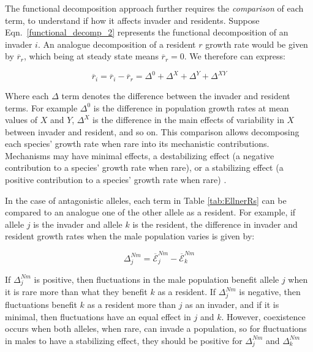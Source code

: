 \documentclass[]{article}
\begin{document}
The functional decomposition approach further requires the \textit{comparison} of each term, to understand if how it affects invader and residents. Suppose Eqn.~\ref{functional_decomp_2} represents the functional  decomposition of an invader $i$. An analogue decomposition of a resident $r$ growth rate would be given by $\overline{r}_{r}$, which being at steady state means $\overline{r}_{r}=0$. We therefore can express:


\begin{equation}
    \overline{r}_{i}= \overline{r}_{i} - \overline{r}_{r} = \Delta^{0} + \Delta^{X}+  \Delta^{Y}+ \Delta^{XY}
   \label{functional_decomp_3}
\end{equation}

Where each $\Delta$ term denotes the difference between the invader and resident terms. For example $\Delta^{0}$  is the difference in population growth rates at mean values of $X$ and $Y$, $\Delta^{X}$ is the difference in the main effects of variability in $X$ between invader and resident, and so on. This comparison allows decomposing each species' growth rate when rare into its mechanistic contributions. Mechanisms may have minimal effects, a destabilizing effect (a negative contribution to a species' growth rate when rare), or a stabilizing effect (a positive contribution to a species' growth rate when rare) \citep{shoemaker2020}.

In the case of antagonistic alleles, each term in Table \ref{tab:EllnerRs} can be compared to an analogue one of the other allele as a resident. For example, if allele $j$ is the invader and allele $k$ is the resident, the difference in invader and resident growth rates when the male population varies is given by:


\begin{equation}
\Delta^{Nm}_{j}= \overline{\mathcal{E}}^{Nm}_{j} - \overline{\mathcal{E}}^{Nm}_{k}
\end{equation}

If $\Delta^{Nm}_{j}$ is positive, then fluctuations in the male population benefit allele $j$ when it is rare more than what they benefit $k$ as a resident. If $\Delta^{Nm}_{j}$ is negative, then fluctuations benefit $k$ as a resident more than $j$ as an invader, and if it is minimal, then fluctuations have an equal effect in $j$ and $k$. However, coexistence occurs when both alleles, when rare, can invade a population, so for fluctuations in males to have a stabilizing effect, they should be positive for $\Delta^{Nm}_{j}$ and $\Delta^{Nm}_{k}$
\end{document}
